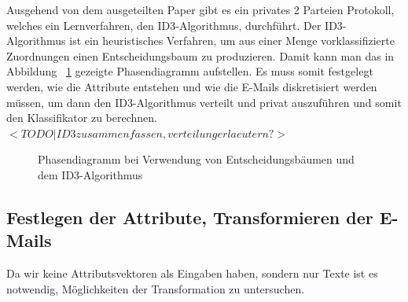 \documentclass{article}
\theoremstyle{definition}
\theoremstyle{remark}
\begin{document}
Ausgehend von dem ausgeteilten Paper gibt es ein privates 2 Parteien Protokoll,
welches ein Lernverfahren, den ID3-Algorithmus, durchf\"uhrt. Der ID3-Algorithmus
ist ein heuristisches Verfahren, um aus einer Menge vorklassifizierte Zuordnungen
einen Entscheidungsbaum zu produzieren. Damit kann man das in Abbildung ~\ref{fig:phase:id3}
gezeigte Phasendiagramm aufstellen. Es muss somit festgelegt werden, wie die 
Attribute entstehen und wie die E-Mails diskretisiert werden m\"ussen, um dann den
ID3-Algorithmus verteilt und privat auszuf\"uhren und somit den Klassifikator zu
berechnen.
\(<TODO| ID3 zusammenfassen, verteilung erlaeutern?>\)
\(<TODO| Bewertung>\)
\begin{figure}
\caption{Phasendiagramm bei Verwendung von Entscheidungsb\"aumen und dem ID3-Algorithmus}
\label{fig:phase:id3}
\end{figure}

\subsection{Festlegen der Attribute, Transformieren der E-Mails}
Da wir keine Attributsvektoren als Eingaben haben, sondern nur Texte ist es
notwendig, M\"oglichkeiten der Transformation zu untersuchen. 
\end{document}

